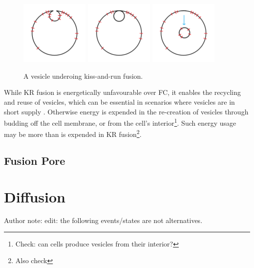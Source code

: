 \documentclass{report}
\begin{document}
\begin{figure}
	\includegraphics[width = 0.3\textwidth]{kr_fusion/6diffuse.png}
	\includegraphics[width = 0.3\textwidth]{kr_fusion/7detach.png}
	\includegraphics[width = 0.3\textwidth]{kr_fusion/8recycle.png}

	\caption{A vesicle underoing kiss-and-run fusion.}
	\label{fig:kiss_run_fusion_multiples}
\end{figure}

While KR fusion is energetically unfavourable over FC, it enables the recycling and reuse of vesicles, which can be essential in scenarios where vesicles are in short supply \cite{harata2006kiss}. Otherwise energy is expended in the re-creation of vesicles through budding off the cell membrane, or from the cell's interior\footnote{Check: can cells produce vesicles from their interior?}. Such energy usage may be more than is expended in KR fusion\footnote{Also check}.

\subsection{Fusion Pore}


\section{Diffusion}
Author note: edit: the following events/states are not alternatives.
\end{document}
